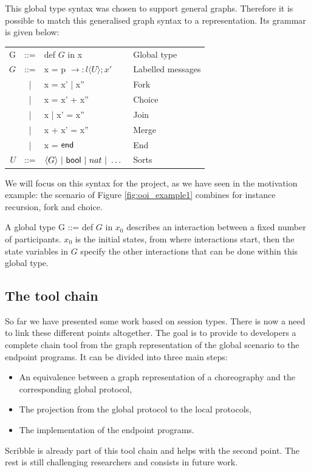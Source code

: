 \documentclass{article}
\newcommand{\kf}[1]{\textup{\textsf{#1}}\xspace}
\newcommand{\G}{\ensuremath{G}}
\newcommand{\UT}{\ensuremath{U}}
\newcommand{\End}{\kf{end}}
\newcommand{\Bool}{\kf{bool}}
\begin{document}
This global type syntax was chosen to support general graphs. Therefore it is possible to match this generalised graph syntax to a representation. 
Its grammar is given below:

\begin{center}
\begin{tabular}{rcll}
G & ::= & def $\G$ in x & Global type \\
$\G$ & ::= & x  = p $\rightarrow : l \langle \UT \rangle;x' $ & Labelled messages\\
& | & x = x' | x'' & Fork\\
& | & x = x' + x'' & Choice\\
& | & x | x' = x'' & Join\\
& | & x + x' = x'' & Merge\\
& | & x = $\End$ & End\\
\UT & ::= &$ \langle G\rangle\ |\ \Bool\ |\ nat \ |\ \ldots\ $ & Sorts
\end{tabular}
\end{center}

We will focus on this syntax for the project, as we have seen in the motivation example: the scenario of Figure \ref{fig:ooi_example1} combines for instance recursion, fork and choice.

A global type G ::= def $\G$ in $x_0$ describes an interaction between a fixed number of participants. $x_0$ is the initial states, from where interactions start, then the state variables in $\G$ specify the other interactions that can be done within this global type.

\subsection{The tool chain}

So far we have presented some work based on session types. There is now a need to link these different points altogether. The goal is to provide to developers a complete chain tool from the graph representation of the global scenario to the endpoint programs. It can be divided into three main steps:
\begin{itemize}
\item An equivalence between a graph representation of a choreography and the corresponding global protocol,
\item The projection from the global protocol to the local protocols,
\item The implementation of the endpoint programs.
\end{itemize}
Scribble is already part of this tool chain and helps with the second point. The rest is still challenging researchers and consists in future work.
\end{document}

